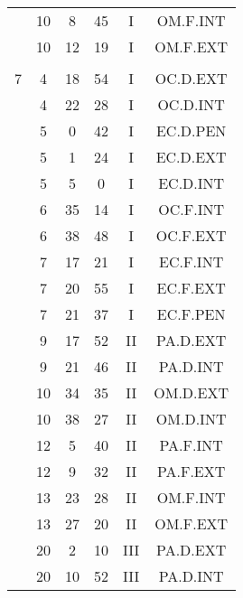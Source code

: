 \documentclass[12pt, a4paper]{article}
\begin{document}
\begin{multicols}{3}
{\begin{tabular}{c c c c c c}
	 	 	 	 & 10 & 8 & 45 & I & OM.F.INT\\%
	 	 	 	 & 10 & 12 & 19 & I & OM.F.EXT\\%
	 	 	 	 & & & & & \\%
	 	 	 	7 & 4 & 18 & 54 & I & OC.D.EXT\\%
	 	 	 	 & 4 & 22 & 28 & I & OC.D.INT\\%
	 	 	 	 & 5 & 0 & 42 & I & EC.D.PEN\\%
	 	 	 	 & 5 & 1 & 24 & I & EC.D.EXT\\%
	 	 	 	 & 5 & 5 & 0 & I & EC.D.INT\\%
	 	 	 	 & 6 & 35 & 14 & I & OC.F.INT\\%
	 	 	 	 & 6 & 38 & 48 & I & OC.F.EXT\\%
	 	 	 	 & 7 & 17 & 21 & I & EC.F.INT\\%
	 	 	 	 & 7 & 20 & 55 & I & EC.F.EXT\\%
	 	 	 	 & 7 & 21 & 37 & I & EC.F.PEN\\%
	 	 	 	 & 9 & 17 & 52 & II & PA.D.EXT\\%
	 	 	 	 & 9 & 21 & 46 & II & PA.D.INT\\%
	 	 	 	 & 10 & 34 & 35 & II & OM.D.EXT\\%
	 	 	 	 & 10 & 38 & 27 & II & OM.D.INT\\%
	 	 	 	 & 12 & 5 & 40 & II & PA.F.INT\\%
	 	 	 	 & 12 & 9 & 32 & II & PA.F.EXT\\%
	 	 	 	 & 13 & 23 & 28 & II & OM.F.INT\\%
	 	 	 	 & 13 & 27 & 20 & II & OM.F.EXT\\%
	 	 	 	 & 20 & 2 & 10 & III & PA.D.EXT\\%
	 	 	 	 & 20 & 10 & 52 & III & PA.D.INT\\%

\end{tabular}}
\end{multicols}
\end{document}
